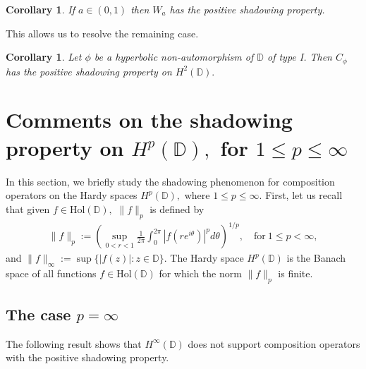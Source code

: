 \documentclass[11pt]{amsart}
\theoremstyle{plain}
\newtheorem{corollary}[definition]{Corollary}
\theoremstyle{remark}
\theoremstyle{plain}
\begin{document}
\begin{corollary}\label{W_a} If $a\in (0,1)$ then $W_a$ has the positive shadowing property.
\end{corollary}

This allows us to resolve the remaining case.

\begin{corollary}\label{hyperbolic non-automorphism of type I}  Let $\phi$ be a hyperbolic non-automorphism of $\mathbb{D}$ of type I. Then $C_{\phi}$ has the positive shadowing property on $H^2(\mathbb{D}).$
\end{corollary}


\section{Comments on the shadowing property on \texorpdfstring{$H^{p}(\mathbb{D}),$ for $1\leq p\leq \infty$}{Hp(D)} }\label{section 4}

In this section, we briefly study the shadowing phenomenon for composition operators on the Hardy spaces $H^p(\mathbb{D}),$ where $1\leq p\leq\infty.$ First, let us recall that given $f\in \mathrm{Hol}(\mathbb{D}),$ $\|f\|_p$ is defined by
\begin{align*}
\|f\|_p:=\left(\sup_{0 < r < 1} \frac{1}{2\pi} \int_{0}^{2\pi} |f(re^{i \theta} )|^p d\theta\right)^{1/p}, \quad \text{for} \ 1\leq p<\infty,
\end{align*}
and $\|f\|_{\infty}:=\sup\{|f(z)|:z\in \mathbb{D}\}.$ The Hardy space $H^p(\mathbb{D})$ is the Banach space of all functions $f\in \mathrm{Hol}(\mathbb{D})$ for which the norm $\|f\|_p$ is finite.


\subsection{The case $p = \infty$}
The following result shows that $H^{\infty}(\mathbb{D})$ does not support composition operators with the positive shadowing property.
\end{document}
